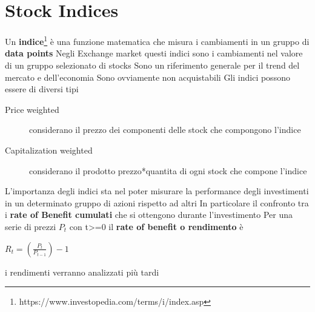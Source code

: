 \documentclass[a4paper,11pt]{report}
\begin{document}
{\section{Stock Indices} \label{Indici:1}
Un \textbf{indice}\footnote{https://www.investopedia.com/terms/i/index.asp} è una funzione matematica che misura i cambiamenti in un gruppo di \textbf{data points} \newline
Negli Exchange market questi indici sono i cambiamenti nel valore di un gruppo selezionato di stocks \newline
Sono un riferimento generale per il trend del mercato e dell'economia \newline
Sono ovviamente non acquistabili \newline
Gli indici possono essere di diversi tipi
\begin{description}
	\item[Price weighted] considerano il prezzo dei componenti delle stock che compongono l'indice
	\item[Capitalization weighted] considerano il prodotto prezzo*quantita di ogni stock che compone l'indice
\end{description}
L'importanza degli indici sta nel poter misurare la performance degli investimenti in un determinato gruppo di azioni rispetto ad altri \newline
In particolare il confronto tra i\textbf{ rate of Benefit cumulati} che si ottengono durante l'investimento \newline
Per una serie di prezzi $P_t$ con t>=0 il \textbf{ rate of benefit o rendimento} è \newline
\begin{center}
	$R_t=({\frac{P_t}{P_{t-1}}})-1$
\end{center}
i rendimenti verranno analizzati più tardi %
\newpage
}
\end{document}
